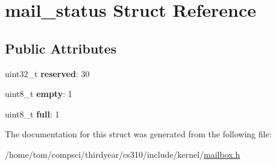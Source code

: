 \hypertarget{structmail__status}{}\section{mail\+\_\+status Struct Reference}
\label{structmail__status}
\subsection*{Public Attributes}
\begin{DoxyCompactItemize}
\item 
\mbox{\label{structmail__status_acf35c55e11d338e645f36154b4955b3f}} 
uint32\+\_\+t {\bfseries reserved}\+: 30
\item 
\mbox{\label{structmail__status_aa5651f1b11926232499cc68815858a95}} 
uint8\+\_\+t {\bfseries empty}\+: 1
\item 
\mbox{\label{structmail__status_ae256c238cb5ea32757e10afa0ef02891}} 
uint8\+\_\+t {\bfseries full}\+: 1
\end{DoxyCompactItemize}


The documentation for this struct was generated from the following file\+:\begin{DoxyCompactItemize}
\item 
/home/tom/compsci/thirdyear/cs310/include/kernel/\mbox{\hyperlink{mailbox_8h}{mailbox.\+h}}\end{DoxyCompactItemize}
